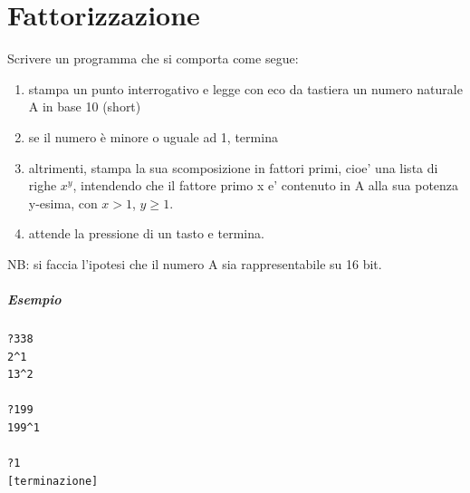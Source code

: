 \documentclass[11pt]{report}
\begin{document}
\chapter{Fattorizzazione}
Scrivere un programma che si comporta come segue:
\begin{enumerate}
\item stampa un punto interrogativo e legge con eco da tastiera un numero naturale A in base 10 (short)
\item se il numero è minore o uguale ad 1, termina
\item altrimenti, stampa la sua scomposizione in fattori primi, cioe' una lista di righe $x^y$, intendendo che il fattore primo x e' contenuto in A alla sua potenza y-esima, con $x>1$, $y\geq 1$.
\item attende la pressione di un tasto e termina.
\end{enumerate}
NB: si faccia l'ipotesi che il numero A sia rappresentabile su 16 bit.

\paragraph{Esempio}
\begin{verbatim}
?338
2^1
13^2

?199
199^1

?1
[terminazione]
\end{verbatim}

\end{document}
